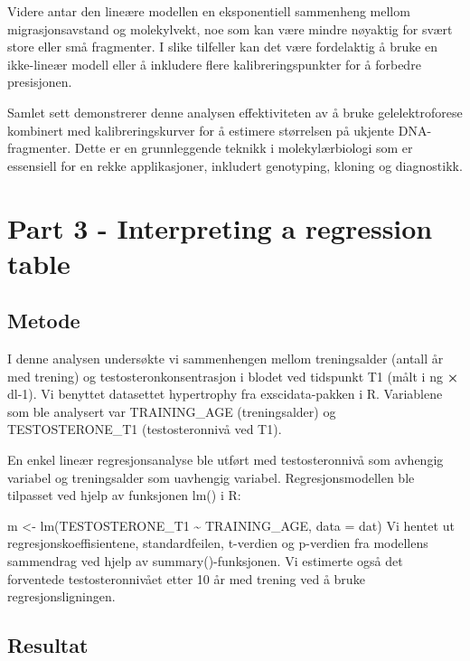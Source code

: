 \documentclass[
  letterpaper,
  DIV=11,
  numbers=noendperiod]{scrreprt}
\begin{document}
Videre antar den lineære modellen en eksponentiell sammenheng mellom
migrasjonsavstand og molekylvekt, noe som kan være mindre nøyaktig for
svært store eller små fragmenter. I slike tilfeller kan det være
fordelaktig å bruke en ikke-lineær modell eller å inkludere flere
kalibreringspunkter for å forbedre presisjonen.

Samlet sett demonstrerer denne analysen effektiviteten av å bruke
gelelektroforese kombinert med kalibreringskurver for å estimere
størrelsen på ukjente DNA-fragmenter. Dette er en grunnleggende teknikk
i molekylærbiologi som er essensiell for en rekke applikasjoner,
inkludert genotyping, kloning og diagnostikk.

\section{Part 3 - Interpreting a regression
table}\label{part-3---interpreting-a-regression-table}

\subsection{Metode}\label{metode-3}

I denne analysen undersøkte vi sammenhengen mellom treningsalder (antall
år med trening) og testosteronkonsentrasjon i blodet ved tidspunkt T1
(målt i ng \textbf{×} dl-1). Vi benyttet datasettet hypertrophy fra
exscidata-pakken i R. Variablene som ble analysert var TRAINING\_AGE
(treningsalder) og TESTOSTERONE\_T1 (testosteronnivå ved T1).

En enkel lineær regresjonsanalyse ble utført med testosteronnivå som
avhengig variabel og treningsalder som uavhengig variabel.
Regresjonsmodellen ble tilpasset ved hjelp av funksjonen lm() i R:

m \textless- lm(TESTOSTERONE\_T1 \textasciitilde{} TRAINING\_AGE, data =
dat) Vi hentet ut regresjonskoeffisientene, standardfeilen, t-verdien og
p-verdien fra modellens sammendrag ved hjelp av summary()-funksjonen. Vi
estimerte også det forventede testosteronnivået etter 10 år med trening
ved å bruke regresjonsligningen.

\subsection{Resultat}\label{resultat-3}
\end{document}
